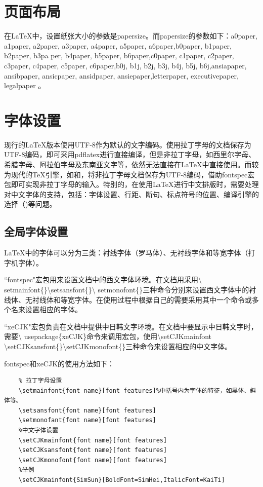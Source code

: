\documentclass[12pt]{book}
\begin{document}
\section{页面布局}

在\LaTeX{}中，设置纸张大小的参数是papersize。而papersize的参数如下：a0paper, a1paper, a2paper, a3paper, a4paper, a5paper, a6paper,b0paper, b1paper, b2paper, b3pa per, b4paper, b5paper, b6paper,c0paper, c1paper, c2paper, c3paper, c4paper, c5paper, c6paper,b0j, b1j, b2j, b3j, b4j, b5j, b6j,ansiapaper, ansibpaper, ansicpaper, ansidpaper, ansiepaper,letterpaper, executivepaper, legalpaper 。

\section{字体设置}


现行的\LaTeX{}版本使用UTF-8作为默认的文字编码。使用拉丁字母的文档保存为UTF-8编码，即可采用pdflatex进行直接编译，但是非拉丁字母，如西里尔字母、希腊字母、阿拉伯字母及东南亚文字等，依然无法直接在\LaTeX{}中直接使用。而较为现代的\TeX{}引擎，如\XeTeX{}和\LuaTeX{}，将非拉丁字母文档保存为UTF-8编码，借助fontspec宏包即可实现非拉丁字母的输入。特别的，在使用\LaTeX{}进行中文排版时，需要处理对中文字体的支持，包括：字体设置、行距、断句、标点符号的位置、编译引擎的选择（\XeLaTeX{})等问题。


\subsection{全局字体设置}

\LaTeX{}中的字体可以分为三类：衬线字体（罗马体）、无衬线字体和等宽字体（打字机字体）。

``fontspec"宏包用来设置文档中的西文字体环境。在文档用采用\textbackslash
setmainfont\{\}\textbackslash setsansfont\{\}\textbackslash
setmonofont\{\}三种命令分别来设置西文字体中的衬线体、无衬线体和等宽字体。在使用过程中根据自己的需要采用其中一个命令或多个名来设置相应的字体。

``xeCJK"宏包负责在文档中提供中日韩文字环境。在文档中要显示中日韩文字时，需要\textbackslash
usepackage\{xeCJK\}命令来调用宏包，使用\textbackslash setCJKmainfont
\textbackslash setCJKsansfont\{\}\textbackslash setCJKmonofont\{\}三种命令来设置相应的中文字体。

fontspec和xeCJK的使用方法如下：

\begin{verbatim}
	% 拉丁字母设置
	\setmainfont{font name}[font features]%中括号内为字体的特征，如黑体、斜体等。
	\setsansfont{font name}[font features]
	\setmonofant{font name}[font features]
	%中文字体设置
	\setCJKmainfont{font name}[font features]
	\setCJKsansfont{font name}[font features]
	\setCJKmonofont{font name}[font features]
	%举例
	\setCJKmainfont{SimSun}[BoldFont=SimHei,ItalicFont=KaiTi]
\end{verbatim}
\end{document}

